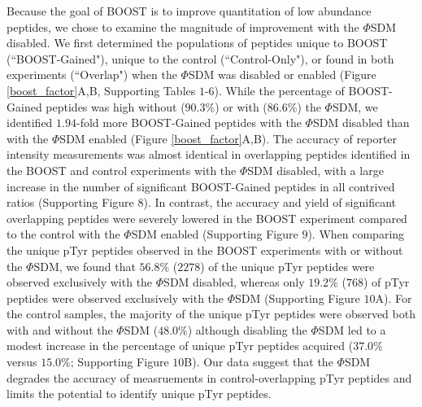 \documentclass[journal=jprobs,manuscript=article]{achemso}
\begin{document}
Because the goal of BOOST is to improve quantitation of low abundance peptides, we chose to examine the magnitude of improvement with the $\Phi$SDM disabled. We first determined the populations of peptides unique to BOOST (``BOOST-Gained"), unique to the control (``Control-Only"), or found in both experiments (``Overlap") when the $\Phi$SDM was disabled or enabled (Figure \ref{boost_factor}A,B, Supporting Tables $1$-$6$). While the percentage of BOOST-Gained peptides was high without ($90.3\%$) or with ($86.6\%$) the $\Phi$SDM, we identified $1.94$-fold more BOOST-Gained peptides with the $\Phi$SDM disabled than with the $\Phi$SDM enabled (Figure \ref{boost_factor}A,B). The accuracy of reporter intensity measurements was almost identical in overlapping peptides identified in the BOOST and control experiments with the $\Phi$SDM disabled, with a large increase in the number of significant BOOST-Gained peptides in all contrived ratios (Supporting Figure $8$). In contrast, the accuracy and yield of significant overlapping peptides were severely lowered in the BOOST experiment compared to the control with the $\Phi$SDM enabled (Supporting Figure $9$). When comparing the unique pTyr peptides observed in the BOOST experiments with or without the $\Phi$SDM, we found that $56.8\%$ ($2278$) of the unique pTyr peptides were observed exclusively with the $\Phi$SDM disabled, whereas only $19.2\%$ ($768$) of pTyr peptides were observed exclusively with the $\Phi$SDM (Supporting Figure $10$A). For the control samples, the majority of the unique pTyr peptides were observed both with and without the $\Phi$SDM ($48.0\%$) although disabling the $\Phi$SDM led to a modest increase in the percentage of unique pTyr peptides acquired ($37.0\%$ versus $15.0\%$; Supporting Figure $10$B). Our data suggest that the $\Phi$SDM degrades the accuracy of measruements in control-overlapping pTyr peptides and limits the potential to identify unique pTyr peptides.
\end{document}
